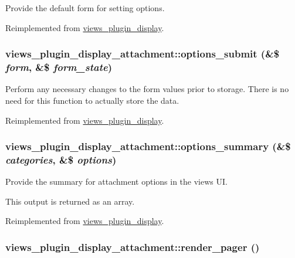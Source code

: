 Provide the default form for setting options. 

Reimplemented from \hyperlink{classviews__plugin__display_d9c69d91ea1165ff51dcd1f1f6d3a154}{views\_\-plugin\_\-display}.\hypertarget{classviews__plugin__display__attachment_63219dfd2bfed59bdf1840d704d11799}{
\subsubsection[{options\_\-submit}]{\setlength{\rightskip}{0pt plus 5cm}views\_\-plugin\_\-display\_\-attachment::options\_\-submit (\&\$ {\em form}, \/  \&\$ {\em form\_\-state})}}
\label{classviews__plugin__display__attachment_63219dfd2bfed59bdf1840d704d11799}


Perform any necessary changes to the form values prior to storage. There is no need for this function to actually store the data. 

Reimplemented from \hyperlink{classviews__plugin__display_75f0b2d5587b365640fcb4d414daae36}{views\_\-plugin\_\-display}.\hypertarget{classviews__plugin__display__attachment_0d54f6bd68c3ebba7af03cd7ac722fe0}{
\subsubsection[{options\_\-summary}]{\setlength{\rightskip}{0pt plus 5cm}views\_\-plugin\_\-display\_\-attachment::options\_\-summary (\&\$ {\em categories}, \/  \&\$ {\em options})}}
\label{classviews__plugin__display__attachment_0d54f6bd68c3ebba7af03cd7ac722fe0}


Provide the summary for attachment options in the views UI.

This output is returned as an array. 

Reimplemented from \hyperlink{classviews__plugin__display_7a2f2aeedfc14816815e3ce65a61aedf}{views\_\-plugin\_\-display}.\hypertarget{classviews__plugin__display__attachment_ecc79a155c6491a0c510568b07c97fb8}{
\subsubsection[{render\_\-pager}]{\setlength{\rightskip}{0pt plus 5cm}views\_\-plugin\_\-display\_\-attachment::render\_\-pager ()}}
\label{classviews__plugin__display__attachment_ecc79a155c6491a0c510568b07c97fb8}


